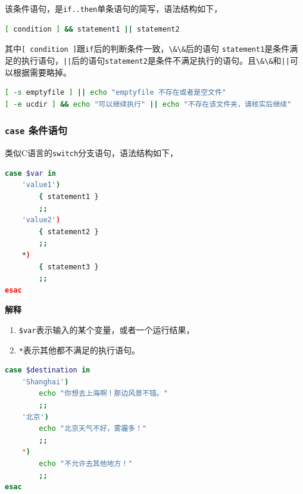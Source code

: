 \documentclass[doctor,openright,twoside]{sjtuthesis}
\providecommand{\tightlist}{%
    \setlength{\itemsep}{0pt}\setlength{\parskip}{0pt}}
\newcommand{\passthrough}[1]{#1}
\theoremstyle{plain}
\theoremstyle{definition}
\theoremstyle{remark}
\theoremstyle{ocrenumbox}
\theoremstyle{plain}
\begin{document}
该条件语句，是\passthrough{\lstinline!if..then!}单条语句的简写，语法结构如下，

\begin{lstlisting}[language=bash]
[ condition ] && statement1 || statement2
\end{lstlisting}

其中\passthrough{\lstinline![ condition ]!}跟\passthrough{\lstinline!if!}后的判断条件一致，\passthrough{\lstinline!\&\&!}后的语句
\passthrough{\lstinline!statement1!}是条件满足的执行语句，\passthrough{\lstinline!||!}后的语句\passthrough{\lstinline!statement2!}是条件不满足执行的语句。且\passthrough{\lstinline!\&\&!}和\passthrough{\lstinline!||!}可以根据需要略掉。

\begin{lstlisting}[language=bash]
[ -s emptyfile ] || echo "emptyfile 不存在或者是空文件"
[ -e ucdir ] && echo "可以继续执行" || echo "不存在该文件夹，请核实后继续"
\end{lstlisting}

\hypertarget{case-}{%
\subsubsection{\texorpdfstring{\texttt{case}
条件语句}{case 条件语句}}\label{case-}}

类似C语言的\passthrough{\lstinline!switch!}分支语句，语法结构如下，

\begin{lstlisting}[language=bash]
case $var in
    'value1')
        { statement1 }
        ;;
    'value2')
        { statement2 }
        ;;
    *)
        { statement3 }
        ;;
esac
\end{lstlisting}

\textbf{解释}

\begin{enumerate}
\def\labelenumi{\arabic{enumi}.}
\tightlist
\item
  \passthrough{\lstinline!$var!}表示输入的某个变量，或者一个运行结果，
\item
  \passthrough{\lstinline!*!}表示其他都不满足的执行语句。
\end{enumerate}

\begin{lstlisting}[language=bash]
case $destination in
    'Shanghai')
        echo "你想去上海啊！那边风景不错。"
        ;;
    '北京')
        echo "北京天气不好，雾霾多！"
        ;;
    *)
        echo "不允许去其他地方！"
        ;;
esac
\end{lstlisting}
\end{document}
